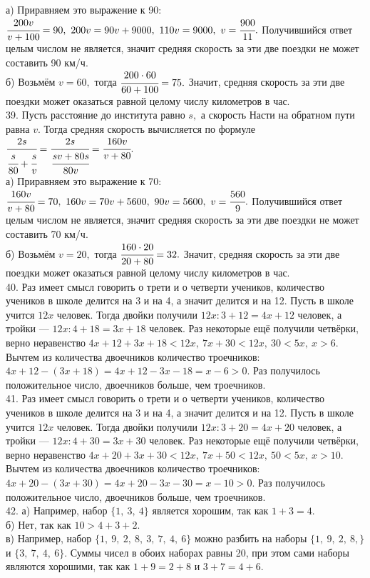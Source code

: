 а) Приравняем это выражение к 90: $\cfrac{200v}{v+100}=90,\ 200v=90v+9000,\ 110v=9000,\ v=\cfrac{900}{11}.$ Получившийся ответ целым числом не является, значит средняя скорость за эти две поездки не может составить 90 км/ч.\\
б) Возьмём $v=60,$ тогда $\cfrac{200\cdot60}{60+100}=75.$ Значит, средняя скорость за эти две поездки может оказаться равной целому числу километров в час.\\
39. Пусть расстояние до института равно $s,$ а скорость Насти на обратном пути равна $v.$ Тогда средняя скорость вычисляется по формуле $\cfrac{2s}{\cfrac{s}{80}+\cfrac{s}{v}}=\cfrac{2s}{\cfrac{sv+80s}{80v}}=\cfrac{160v}{v+80}.$\\
а) Приравняем это выражение к 70: $\cfrac{160v}{v+80}=70,\ 160v=70v+5600,\ 90v=5600,\ v=\cfrac{560}{9}.$ Получившийся ответ целым числом не является, значит средняя скорость за эти две поездки не может составить 70 км/ч.\\
б) Возьмём $v=20,$ тогда $\cfrac{160\cdot20}{20+80}=32.$ Значит, средняя скорость за эти две поездки может оказаться равной целому числу километров в час.\\
40. Раз имеет смысл говорить о трети и о четверти учеников, количество учеников в школе делится на 3 и на 4, а значит делится и на 12. Пусть в школе учится $12x$ человек. Тогда двойки получили $12x:3+12=4x+12$ человек, а тройки --- $12x:4+18=3x+18$ человек. Раз некоторые ещё получили четвёрки, верно неравенство $4x+12+3x+18<12x,\ 7x+30<12x,\ 30<5x,\ x>6.$ Вычтем из количества двоечников количество троечников: $4x+12-(3x+18)=4x+12-3x-18=x-6>0.$ Раз получилось положительное число, двоечников больше, чем троечников.\\
41. Раз имеет смысл говорить о трети и о четверти учеников, количество учеников в школе делится на 3 и на 4, а значит делится и на 12. Пусть в школе учится $12x$ человек. Тогда двойки получили $12x:3+20=4x+20$ человек, а тройки --- $12x:4+30=3x+30$ человек. Раз некоторые ещё получили четвёрки, верно неравенство $4x+20+3x+30<12x,\ 7x+50<12x,\ 50<5x,\ x>10.$ Вычтем из количества двоечников количество троечников: $4x+20-(3x+30)=4x+20-3x-30=x-10>0.$ Раз получилось положительное число, двоечников больше, чем троечников.\\
42. а) Например, набор $\{1,\ 3,\ 4\}$ является хорошим, так как $1+3=4.$\\
б) Нет, так как $10>4+3+2.$\\
в) Например, набор $\{1,\ 9,\ 2,\ 8,\ 3,\ 7,\ 4,\ 6\}$ можно разбить на наборы $\{1,\ 9,\ 2,\ 8,\}$ и $\{3,\ 7,\ 4,\ 6\}.$ Суммы чисел в обоих наборах равны 20, при этом сами наборы являются хорошими, так как $1+9=2+8$ и $3+7=4+6.$\\
